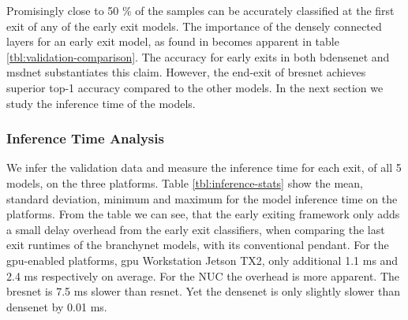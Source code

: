 Promisingly close to 50 \% of the samples can be accurately classified at the first exit of any of the early exit models. The importance of the densely connected layers for an early exit model, as found in \cite{huang_multi-scale_2017} becomes apparent in table \ref{tbl:validation-comparison}. The accuracy for early exits in both \gls{bdensenet} and \gls{msdnet} substantiates this claim. However, the end-exit of \gls{bresnet} achieves superior top-1 accuracy compared to the other models. In the next section we study the inference time of the models.  

\subsubsection{Inference Time Analysis}

We infer the validation data and measure the inference time for each exit, of all 5 models, on the three platforms. Table \ref{tbl:inference-stats} show the mean, standard deviation, minimum and maximum for the model inference time on the platforms. From the table we can see, that the early exiting framework only adds a small delay overhead from the early exit classifiers, when comparing the last exit runtimes of the \gls{branchynet} models, with its conventional pendant. For the \gls{gpu}-enabled platforms, \gls{gpu} Workstation Jetson TX2, only additional 1.1 ms and 2.4 ms respectively on average. For the NUC the overhead is more apparent. The \gls{bresnet} is  7.5 ms slower than \gls{resnet}. Yet the \gls{densenet} is only slightly slower than \gls{densenet} by 0.01 ms.   

